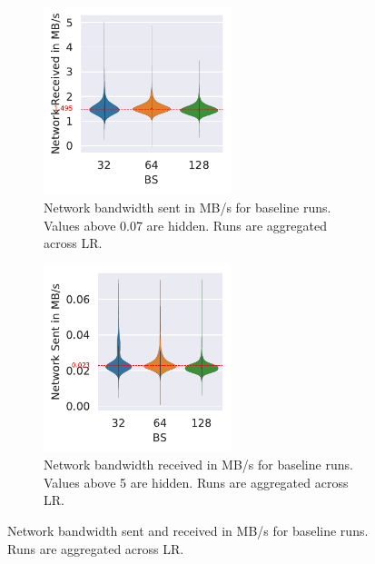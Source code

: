 \begin{figure}[h]
    \centering
    \begin{subfigure}[t]{0.475 \textwidth}
        \centering
        \caption{Network bandwidth sent in MB/s for baseline runs. Values above 0.07 are hidden. Runs are aggregated across LR.}
        \label{fig:net-sent_baseline}
        \includegraphics[width=0.6\textwidth]{./figures/06_net-recv_baseline-16vCPUs-GAS-1.pdf}
    \end{subfigure}
    \centering
    \begin{subfigure}[t]{0.475 \textwidth}
        \centering
        \caption{Network bandwidth received in MB/s for baseline runs. Values above 5 are hidden. Runs are aggregated across LR.}
        \label{fig:net-recv_baseline}
        \includegraphics[width=0.6\textwidth]{./figures/06_net-sent_baseline-16vCPUs-GAS-1.pdf}
    \end{subfigure}%
    \hfill
    \caption{Network bandwidth sent and received in MB/s for baseline runs. Runs are aggregated across LR.}
\end{figure}

